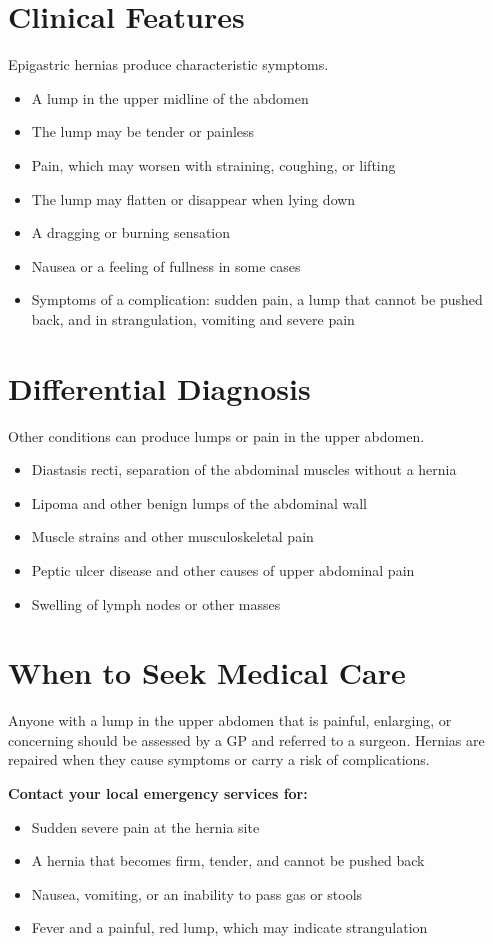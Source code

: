 \section*{Clinical Features}
Epigastric hernias produce characteristic symptoms.
\begin{itemize}
    \item A lump in the upper midline of the abdomen
    \item The lump may be tender or painless
    \item Pain, which may worsen with straining, coughing, or lifting
    \item The lump may flatten or disappear when lying down
    \item A dragging or burning sensation
    \item Nausea or a feeling of fullness in some cases
    \item Symptoms of a complication: sudden pain, a lump that cannot be pushed back, and in strangulation, vomiting and severe pain
\end{itemize}

\section*{Differential Diagnosis}
Other conditions can produce lumps or pain in the upper abdomen.
\begin{itemize}
    \item Diastasis recti, separation of the abdominal muscles without a hernia
    \item Lipoma and other benign lumps of the abdominal wall
    \item Muscle strains and other musculoskeletal pain
    \item Peptic ulcer disease and other causes of upper abdominal pain
    \item Swelling of lymph nodes or other masses
\end{itemize}

\section*{When to Seek Medical Care}
Anyone with a lump in the upper abdomen that is painful, enlarging, or concerning should be assessed by a GP and referred to a surgeon. Hernias are repaired when they cause symptoms or carry a risk of complications.

\textbf{Contact your local emergency services for:}
\begin{itemize}
    \item Sudden severe pain at the hernia site
    \item A hernia that becomes firm, tender, and cannot be pushed back
    \item Nausea, vomiting, or an inability to pass gas or stools
    \item Fever and a painful, red lump, which may indicate strangulation
\end{itemize}

